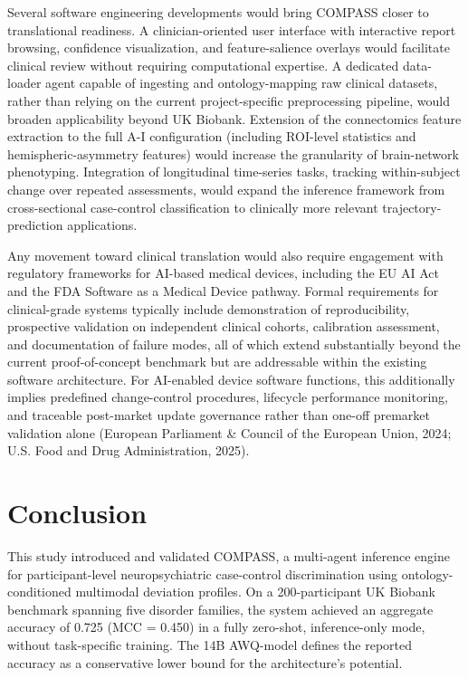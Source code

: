 \documentclass[11pt,a4paper,twoside]{article}
\begin{document}
Several software engineering developments would bring COMPASS closer to translational readiness. A clinician-oriented user interface with interactive report browsing, confidence visualization, and feature-salience overlays would facilitate clinical review without requiring computational expertise. A dedicated data-loader agent capable of ingesting and ontology-mapping raw clinical datasets, rather than relying on the current project-specific preprocessing pipeline, would broaden applicability beyond UK Biobank. Extension of the connectomics feature extraction to the full A-I configuration (including ROI-level statistics and hemispheric-asymmetry features) would increase the granularity of brain-network phenotyping. Integration of longitudinal time-series tasks, tracking within-subject change over repeated assessments, would expand the inference framework from cross-sectional case-control classification to clinically more relevant trajectory-prediction applications.

Any movement toward clinical translation would also require engagement with regulatory frameworks for AI-based medical devices, including the EU AI Act and the FDA Software as a Medical Device pathway. Formal requirements for clinical-grade systems typically include demonstration of reproducibility, prospective validation on independent clinical cohorts, calibration assessment, and documentation of failure modes, all of which extend substantially beyond the current proof-of-concept benchmark but are addressable within the existing software architecture. For AI-enabled device software functions, this additionally implies predefined change-control procedures, lifecycle performance monitoring, and traceable post-market update governance rather than one-off premarket validation alone (European Parliament \& Council of the European Union, 2024; U.S. Food and Drug Administration, 2025).

\section{Conclusion}

This study introduced and validated COMPASS, a multi-agent inference engine for participant-level neuropsychiatric case-control discrimination using ontology-conditioned multimodal deviation profiles. On a 200-participant UK Biobank benchmark spanning five disorder families, the system achieved an aggregate accuracy of 0.725 (MCC = 0.450) in a fully zero-shot, inference-only mode, without task-specific training. The 14B AWQ-model defines the reported accuracy as a conservative lower bound for the architecture's potential.
\end{document}
